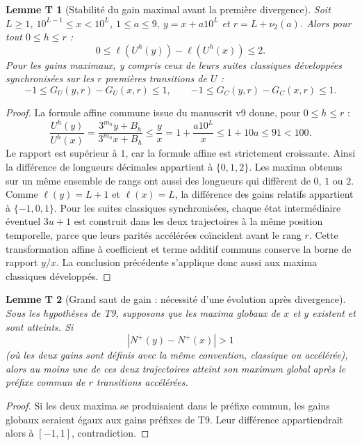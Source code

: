 \documentclass[11pt,a4paper]{article}
\newtheorem{lemmet}{Lemme T}
\newcommand{\ellg}{\ell}
\newcommand{\UU}{U}
\begin{document}
\begin{lemmet}[Stabilité du gain maximal avant la première divergence]
Soit $L\ge1$, $10^{L-1}\le x<10^L$, $1\le a\le9$, $y=x+a10^L$ et $r=L+\nu_2(a)$. Alors pour tout $0\le h\le r$ :
\[
 \boxed{0\le\ellg(\UU^h(y))-\ellg(\UU^h(x))\le2}.
\]
Pour les gains maximaux, y compris ceux de leurs suites classiques développées synchronisées sur les $r$ premières transitions de $\UU$ :
\[
 \boxed{-1\le G_U(y,r)-G_U(x,r)\le1},\qquad
 \boxed{-1\le G_C(y,r)-G_C(x,r)\le1}.
\]
\end{lemmet}
\begin{proof}
La formule affine commune issue du manuscrit v9 donne, pour $0\le h\le r$ :
\[
 \frac{\UU^h(y)}{\UU^h(x)}
 =\frac{3^{m_h}y+B_h}{3^{m_h}x+B_h}
 \le\frac yx=1+\frac{a10^L}{x}\le1+10a\le91<100.
\]
Le rapport est supérieur à $1$, car la formule affine est strictement croissante. Ainsi la différence de longueurs décimales appartient à $\{0,1,2\}$. Les maxima obtenus sur un même ensemble de rangs ont aussi des longueurs qui diffèrent de $0$, $1$ ou $2$. Comme $\ellg(y)=L+1$ et $\ellg(x)=L$, la différence des gains relatifs appartient à $\{-1,0,1\}$.
Pour les suites classiques synchronisées, chaque état intermédiaire éventuel $3u+1$ est construit dans les deux trajectoires à la même position temporelle, parce que leurs parités accélérées coïncident avant le rang $r$. Cette transformation affine à coefficient et terme additif communs conserve la borne de rapport $y/x$. La conclusion précédente s'applique donc aussi aux maxima classiques développés.
\end{proof}

\begin{lemmet}[Grand saut de gain : nécessité d'une évolution après divergence]
Sous les hypothèses de T9, supposons que les maxima globaux de $x$ et $y$ existent et sont atteints. Si
\[
 \boxed{|N^+(y)-N^+(x)|>1}
\]
(où les deux gains sont définis avec la même convention, classique ou accélérée), alors au moins une de ces deux trajectoires atteint son maximum global après le préfixe commun de $r$ transitions accélérées.
\end{lemmet}
\begin{proof}
Si les deux maxima se produisaient dans le préfixe commun, les gains globaux seraient égaux aux gains préfixes de T9. Leur différence appartiendrait alors à $[-1,1]$, contradiction.
\end{proof}
\end{document}

